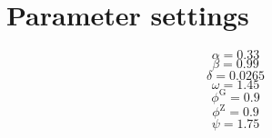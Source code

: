 \section{Parameter settings}

\begin{equation}
\alpha = 0.33
\end{equation}
\begin{equation}
\beta = 0.99
\end{equation}
\begin{equation}
\delta = 0.0265
\end{equation}
\begin{equation}
\omega = 1.45
\end{equation}
\begin{equation}
\phi^{\mathrm{G}} = 0.9
\end{equation}
\begin{equation}
\phi^{\mathrm{Z}} = 0.9
\end{equation}
\begin{equation}
\psi = 1.75
\end{equation}



